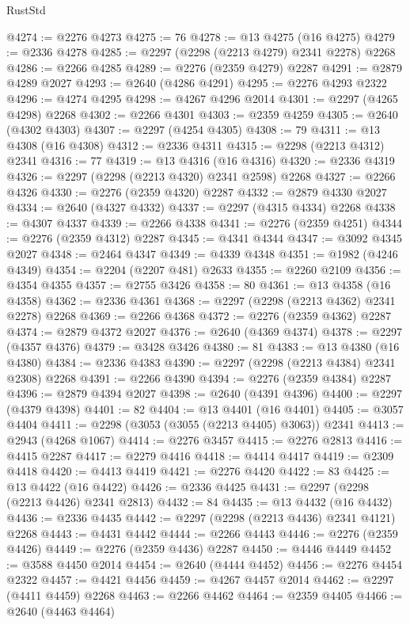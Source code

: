 \begin{lexlean}{RustStd}
\begin{coremodule}
@4274 := @2276 @4273
@4275 := 76
@4278 := @13 @4275 (@16 @4275)
@4279 := @2336 @4278
@4285 := @2297 (@2298 (@2213 @4279) @2341 @2278) @2268
@4286 := @2266 @4285
@4289 := @2276 (@2359 @4279) @2287
@4291 := @2879 @4289 @2027
@4293 := @2640 (@4286 @4291)
@4295 := @2276 @4293 @2322
@4296 := @4274 @4295
@4298 := @4267 @4296 @2014
@4301 := @2297 (@4265 @4298) @2268
@4302 := @2266 @4301
@4303 := @2359 @4259
@4305 := @2640 (@4302 @4303)
@4307 := @2297 (@4254 @4305)
@4308 := 79
@4311 := @13 @4308 (@16 @4308)
@4312 := @2336 @4311
@4315 := @2298 (@2213 @4312) @2341
@4316 := 77
@4319 := @13 @4316 (@16 @4316)
@4320 := @2336 @4319
@4326 := @2297 (@2298 (@2213 @4320) @2341 @2598) @2268
@4327 := @2266 @4326
@4330 := @2276 (@2359 @4320) @2287
@4332 := @2879 @4330 @2027
@4334 := @2640 (@4327 @4332)
@4337 := @2297 (@4315 @4334) @2268
@4338 := @4307 @4337
@4339 := @2266 @4338
@4341 := @2276 (@2359 @4251)
@4344 := @2276 (@2359 @4312) @2287
@4345 := @4341 @4344
@4347 := @3092 @4345 @2027
@4348 := @2464 @4347
@4349 := @4339 @4348
@4351 := @1982 (@4246 @4349)
@4354 := @2204 (@2207 @481) @2633
@4355 := @2260 @2109
@4356 := @4354 @4355
@4357 := @2755 @3426
@4358 := 80
@4361 := @13 @4358 (@16 @4358)
@4362 := @2336 @4361
@4368 := @2297 (@2298 (@2213 @4362) @2341 @2278) @2268
@4369 := @2266 @4368
@4372 := @2276 (@2359 @4362) @2287
@4374 := @2879 @4372 @2027
@4376 := @2640 (@4369 @4374)
@4378 := @2297 (@4357 @4376)
@4379 := @3428 @3426
@4380 := 81
@4383 := @13 @4380 (@16 @4380)
@4384 := @2336 @4383
@4390 := @2297 (@2298 (@2213 @4384) @2341 @2308) @2268
@4391 := @2266 @4390
@4394 := @2276 (@2359 @4384) @2287
@4396 := @2879 @4394 @2027
@4398 := @2640 (@4391 @4396)
@4400 := @2297 (@4379 @4398)
@4401 := 82
@4404 := @13 @4401 (@16 @4401)
@4405 := @3057 @4404
@4411 := @2298 (@3053 (@3055 (@2213 @4405) @3063)) @2341
@4413 := @2943 (@4268 @1067)
@4414 := @2276 @3457
@4415 := @2276 @2813
@4416 := @4415 @2287
@4417 := @2279 @4416
@4418 := @4414 @4417
@4419 := @2309 @4418
@4420 := @4413 @4419
@4421 := @2276 @4420
@4422 := 83
@4425 := @13 @4422 (@16 @4422)
@4426 := @2336 @4425
@4431 := @2297 (@2298 (@2213 @4426) @2341 @2813)
@4432 := 84
@4435 := @13 @4432 (@16 @4432)
@4436 := @2336 @4435
@4442 := @2297 (@2298 (@2213 @4436) @2341 @4121) @2268
@4443 := @4431 @4442
@4444 := @2266 @4443
@4446 := @2276 (@2359 @4426)
@4449 := @2276 (@2359 @4436) @2287
@4450 := @4446 @4449
@4452 := @3588 @4450 @2014
@4454 := @2640 (@4444 @4452)
@4456 := @2276 @4454 @2322
@4457 := @4421 @4456
@4459 := @4267 @4457 @2014
@4462 := @2297 (@4411 @4459) @2268
@4463 := @2266 @4462
@4464 := @2359 @4405
@4466 := @2640 (@4463 @4464)

\end{coremodule}
\end{lexlean}
